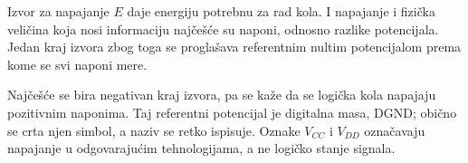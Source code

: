 Izvor za napajanje $E$ daje energiju potrebnu za rad kola. I napajanje i fizička veličina koja nosi informaciju najčešće su naponi, odnosno razlike potencijala. Jedan kraj izvora zbog toga se proglašava referentnim nultim potencijalom prema kome se svi naponi mere.

Najčešće se bira negativan kraj izvora, pa se kaže da se logička kola napajaju pozitivnim naponima. Taj referentni potencijal je digitalna masa, DGND; obično se crta njen simbol, a naziv se retko ispisuje. Oznake $V_{CC}$ i $V_{DD}$ označavaju napajanje u odgovarajućim tehnologijama, a ne logičko stanje signala.
